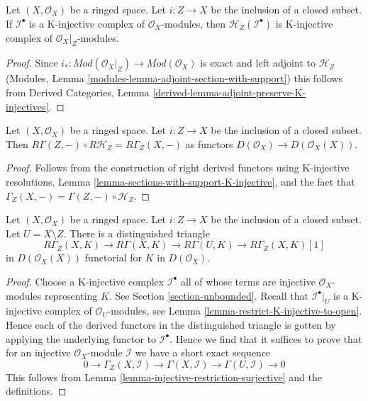 \begin{lemma}
\label{lemma-sections-with-support-K-injective}
Let $(X, \mathcal{O}_X)$ be a ringed space. Let $i : Z \to X$
be the inclusion of a closed subset. If $\mathcal{I}^\bullet$ is a K-injective
complex of $\mathcal{O}_X$-modules, then
$\mathcal{H}_Z(\mathcal{I}^\bullet)$ is K-injective complex of
$\mathcal{O}_X|_Z$-modules.
\end{lemma}

\begin{proof}
Since $i_* : \textit{Mod}(\mathcal{O}_X|_Z) \to \textit{Mod}(\mathcal{O}_X)$
is exact and left adjoint to $\mathcal{H}_Z$
(Modules, Lemma \ref{modules-lemma-adjoint-section-with-support})
this follows from
Derived Categories, Lemma \ref{derived-lemma-adjoint-preserve-K-injectives}.
\end{proof}

\begin{lemma}
\label{lemma-local-to-global-sections-with-support}
Let $(X, \mathcal{O}_X)$ be a ringed space. Let $i : Z \to X$ be the
inclusion of a closed subset. Then
$R\Gamma(Z, - ) \circ R\mathcal{H}_Z = R\Gamma_Z(X, - )$
as functors $D(\mathcal{O}_X) \to D(\mathcal{O}_X(X))$.
\end{lemma}

\begin{proof}
Follows from the construction of right derived functors using
K-injective resolutions, Lemma \ref{lemma-sections-with-support-K-injective},
and the fact that $\Gamma_Z(X, -) = \Gamma(Z, -) \circ \mathcal{H}_Z$.
\end{proof}

\begin{lemma}
\label{lemma-triangle-sections-with-support}
Let $(X, \mathcal{O}_X)$ be a ringed space. Let $i : Z \to X$ be the
inclusion of a closed subset. Let $U = X \setminus Z$.
There is a distinguished triangle
$$
R\Gamma_Z(X, K) \to R\Gamma(X, K) \to R\Gamma(U, K) \to
R\Gamma_Z(X, K)[1]
$$
in $D(\mathcal{O}_X(X))$ functorial for $K$ in $D(\mathcal{O}_X)$.
\end{lemma}

\begin{proof}
Choose a K-injective complex $\mathcal{I}^\bullet$ all of whose terms
are injective $\mathcal{O}_X$-modules representing $K$. See
Section \ref{section-unbounded}. Recall that $\mathcal{I}^\bullet|_U$
is a K-injective complex of $\mathcal{O}_U$-modules, see
Lemma \ref{lemma-restrict-K-injective-to-open}. Hence each
of the derived functors in the distinguished triangle is gotten
by applying the underlying functor to $\mathcal{I}^\bullet$.
Hence we find that it suffices to prove that
for an injective $\mathcal{O}_X$-module $\mathcal{I}$ we have
a short exact sequence
$$
0 \to \Gamma_Z(X, \mathcal{I}) \to \Gamma(X, \mathcal{I})
\to \Gamma(U, \mathcal{I}) \to 0
$$
This follows from Lemma \ref{lemma-injective-restriction-surjective}
and the definitions.
\end{proof}

